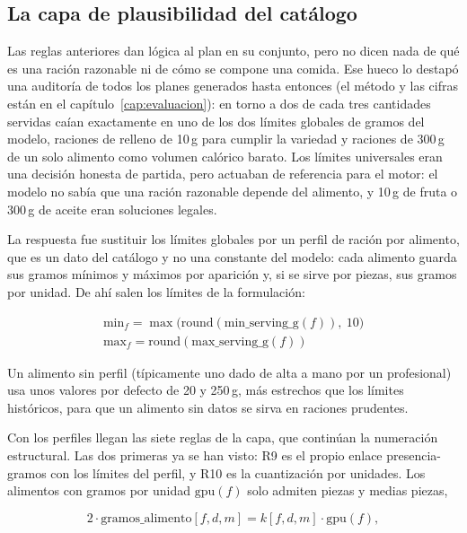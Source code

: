 \subsection{La capa de plausibilidad del catálogo}
\label{sec:plausibilidad}

Las reglas anteriores dan lógica al plan en su conjunto, pero no dicen nada de qué es una ración razonable ni de cómo se compone una comida. Ese hueco lo destapó una auditoría de todos los planes generados hasta entonces (el método y las cifras están en el capítulo~\ref{cap:evaluacion}): en torno a dos de cada tres cantidades servidas caían exactamente en uno de los dos límites globales de gramos del modelo, raciones de relleno de 10\,g para cumplir la variedad y raciones de 300\,g de un solo alimento como volumen calórico barato. Los límites universales eran una decisión honesta de partida, pero actuaban de referencia para el motor: el modelo no sabía que una ración razonable depende del alimento, y 10\,g de fruta o 300\,g de aceite eran soluciones legales.

La respuesta fue sustituir los límites globales por un perfil de ración por alimento, que es un dato del catálogo y no una constante del modelo: cada alimento guarda sus gramos mínimos y máximos por aparición y, si se sirve por piezas, sus gramos por unidad. De ahí salen los límites de la formulación:

\begin{gather*}
\text{min}_f = \max\big(\text{round}(\text{min\_serving\_g}(f)),\ 10\big) \\
\text{max}_f = \text{round}(\text{max\_serving\_g}(f))
\end{gather*}

Un alimento sin perfil (típicamente uno dado de alta a mano por un profesional) usa unos valores por defecto de 20 y 250\,g, más estrechos que los límites históricos, para que un alimento sin datos se sirva en raciones prudentes.

Con los perfiles llegan las siete reglas de la capa, que continúan la numeración estructural. Las dos primeras ya se han visto: R9 es el propio enlace presencia-gramos con los límites del perfil, y R10 es la cuantización por unidades. Los alimentos con gramos por unidad $\text{gpu}(f)$ solo admiten piezas y medias piezas,

\begin{equation*}
2 \cdot \text{gramos\_alimento}[f,d,m] = k[f,d,m] \cdot \text{gpu}(f),
\end{equation*}

